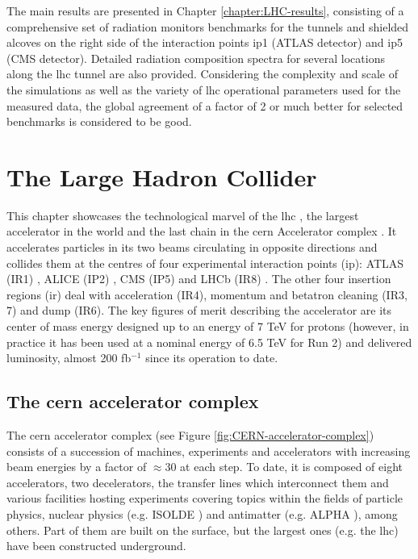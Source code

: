 \documentclass[encoding=utf8,british]{tumphthesis}
\begin{document}
The main results are presented in Chapter \ref{chapter:LHC-results}, consisting of a comprehensive set of radiation monitors benchmarks for the tunnels and shielded alcoves on the right side of the interaction points \acrshort{ip}1 (ATLAS detector) and \acrshort{ip}5 (CMS detector). Detailed radiation composition spectra for several locations along the \acrshort{lhc} tunnel are also provided. Considering the complexity and scale of the simulations as well as the variety of \acrshort{lhc} operational parameters used for the measured data, the global agreement of a factor of 2 or much better for selected benchmarks is considered to be good.







\chapter{The Large Hadron Collider}
\label{chapter:LHC}
This chapter showcases the technological marvel of the \acrfull{lhc} \cite{LHC-design-report}, the largest accelerator in the world and the last chain in the \acrshort{cern} Accelerator complex \cite{CERN-accelerator-complex}. It accelerates particles in its two beams circulating in opposite directions and collides them at the centres of four experimental interaction points (\acrshort{ip}): ATLAS (IR1) \cite{Aad:2008zzm}, ALICE (IP2) \cite{Aamodt:2008zz}, CMS (IP5) \cite{Chatrchyan:2008aa} and LHCb (IR8) \cite{Alves:2008zz}. The other four insertion regions (\acrshort{ir}) deal with acceleration (IR4), momentum and betatron cleaning (IR3, 7) and dump (IR6). The key figures of merit describing the accelerator are its center of mass energy designed up to an energy of 7 TeV for protons (however, in practice it has been used at a nominal energy of 6.5 TeV for Run 2) and delivered luminosity, almost 200 fb$^{-1}$ since its operation to date.

\section{The \acrshort{cern} accelerator complex}

The \acrshort{cern} accelerator complex \cite{CERN-accelerator-complex} (see Figure \ref{fig:CERN-accelerator-complex}) consists of a succession of machines, experiments and accelerators with increasing beam energies by a factor of $\approx 30$ at each step. To date, it is composed of eight accelerators, two decelerators, the transfer lines which interconnect them and various facilities hosting experiments covering topics within the fields of particle physics, nuclear physics (e.g. ISOLDE \cite{ISOLDE}) and antimatter (e.g. ALPHA \cite{ALPHA}), among others. Part of them are built on the surface, but the largest ones (e.g. the \acrshort{lhc}) have been constructed underground.
\end{document}
